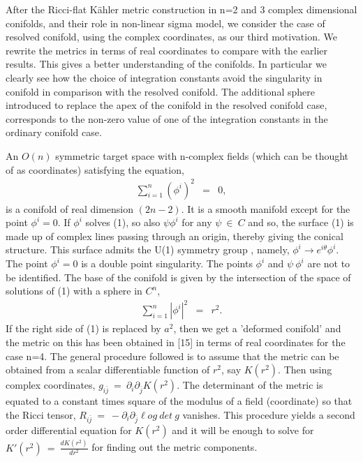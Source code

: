 \documentclass[a4paper,12pt]{article}
\begin{document}
{\vspace{0.5cm}

After the Ricci-flat K\"{a}hler metric construction  
in n=2 and 3 complex dimensional conifolds, and their role in non-linear sigma model, we consider the case of resolved conifold, using the complex coordinates, as 
our third motivation. 
We rewrite the metrics in
terms of real coordinates to compare with the earlier results. This gives a better
understanding of the conifolds. In particular we clearly see how the choice of integration
constants avoid the singularity in conifold in comparison with the resolved conifold. The
additional sphere introduced to replace the apex of the conifold in the resolved conifold
case, corresponds to the non-zero value of one of the integration constants in
the ordinary conifold case.  

\vspace{0.5cm}

{}

\vspace{0.5cm}

An $O(n)$ symmetric target space with n-complex fields (which can be thought of as
coordinates) satisfying the equation,
\begin{eqnarray}
\sum_{i=1}^{n} ({\phi}^i)^2 &=& 0,
\end{eqnarray}
is a conifold of real dimension $(2n-2)$. It is a smooth manifold except for the point
${\phi}^i=0$. If ${\phi}^i$ solves (1), so also $\psi {\phi}^i$ for any $\psi\ \in\
C$ and so, the surface (1) is made up of complex lines passing through an origin,
thereby giving the conical structure. This surface admits the U(1) symmetry group
, namely, ${\phi}^i\rightarrow e^{i\theta}{\phi}^i$. The point ${\phi}^i=0$ is a 
double point singularity. The points ${\phi}^i$ and 
$\psi\ {\phi}^i$ are not to be identified. The base of the conifold is given
by the intersection of the space of solutions of (1) with a sphere in $C^n$,
\begin{eqnarray}
\sum_{i=1}^{n}|{\phi}^i|^2 &=& r^2.
\end{eqnarray}
If the right side of (1) is replaced by $a^2$, then we get a 'deformed conifold' and the metric
on this has been obtained in [15] in terms of real coordinates for the case n=4. The general
procedure followed is to assume that the metric can be obtained from a scalar differentiable
function of $r^2$, say $K(r^2)$. Then using complex coordinates, $g_{i\bar{j}}\ =\
 {\partial}_i{\partial}_{\bar{j}}K(r^2)$. The determinant of the metric is 
equated to a constant times square of the modulus of a field (coordinate)  
 so that the Ricci tensor, $R_{i\bar{j}}\ =\ 
-{\partial}_i{\partial}_{\bar{j}}\ell og\ det\ g$ vanishes. This procedure yields a second order differential equation for $K(r^2)$ and it will be enough to solve for $K'(r^2)\ =\ 
\frac{dK(r^2)}{dr^2}$ for finding out the metric components.  

}
\end{document}
